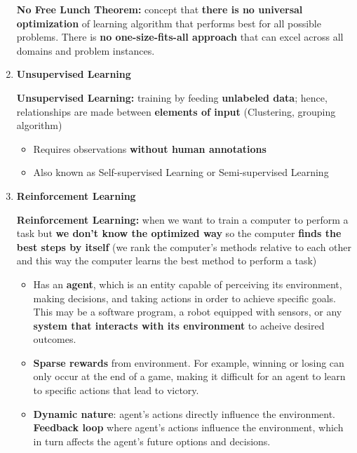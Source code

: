 \begin{enumerate}
\begin{theorem}
\textbf{No Free Lunch Theorem:} concept that \textbf{there is no universal optimization} of learning algorithm that performs best for all possible problems. There is \textbf{no one-size-fits-all approach} that can excel across all domains and problem instances.
\end{theorem}

    \item \textbf{Unsupervised Learning}
\begin{definition}
  \textbf{ Unsupervised Learning:}  training by feeding \textbf{unlabeled data}; hence, relationships are made between \textbf{elements of input} (Clustering, grouping algorithm)
\end{definition}
\begin{itemize}
    \item Requires observations\textbf{ without human annotations}
    \item Also known as Self-supervised Learning or Semi-supervised Learning
\end{itemize}
    \item \textbf{Reinforcement Learning}
\begin{definition}
    \textbf{Reinforcement Learning:} when we want to train a computer to perform a task but \textbf{we don’t know the optimized way} so the computer \textbf{finds the best steps by itself} (we rank the computer’s methods relative to each other and this way the computer learns the best method to perform a task)
\end{definition}
\begin{itemize}
    \item Has an\textbf{ agent}, which is an entity capable of perceiving its environment, making decisions, and taking actions in order to achieve specific goals. This may be a software program, a robot equipped with sensors, or any \textbf{system that interacts with its environment} to acheive desired outcomes. 
    \item \textbf{Sparse rewards} from environment. For example, winning or losing can only occur at the end of a game, making it difficult for an agent to learn to specific actions that lead to victory.
    \item \textbf{Dynamic nature}: agent's actions directly influence the environment. \textbf{Feedback loop} where agent's actions influence the environment, which in turn affects the agent's future options and decisions.

\end{itemize}

\end{enumerate}

